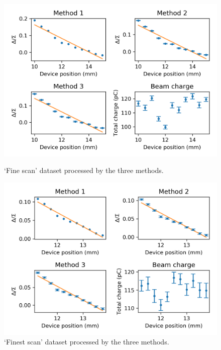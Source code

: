 \begin{figure}[!t] %
\centering
\includegraphics[scale=.8, keepaspectratio]{pictures/fine_4_proc_5b.png}
\caption{`Fine scan' dataset processed by the three methods.}\label{fig:5b_fine}



\includegraphics[scale=.8, keepaspectratio]{pictures/finest_4_proc_5b.png}
\caption{`Finest scan' dataset processed by the three methods.}\label{fig:5b_finest}
\end{figure}






